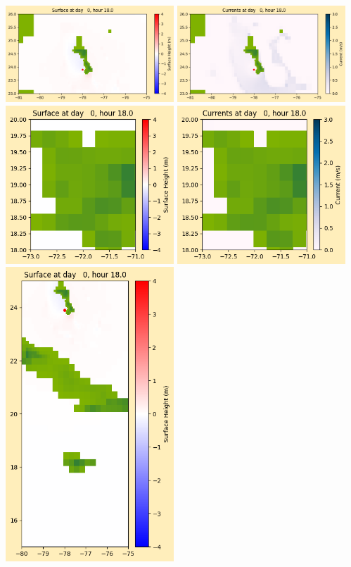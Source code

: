 \documentclass[11pt]{article}
\begin{document}
\vskip 10pt 
\includegraphics[width=0.475\textwidth]{frame0015fig1003.png}
\includegraphics[width=0.475\textwidth]{frame0015fig1004.png}
\vskip 10pt 
\includegraphics[width=0.475\textwidth]{frame0015fig1005.png}
\includegraphics[width=0.475\textwidth]{frame0015fig1006.png}
\vskip 10pt 
\includegraphics[width=0.475\textwidth]{frame0015fig1007.png}
\end{document}
